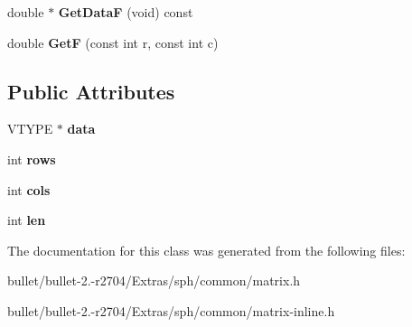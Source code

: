 \begin{DoxyCompactItemize}
\item 
\hypertarget{class_matrix_f_a292d69f3f0849c296cf80ad8487b7ebe}{double $\ast$ {\bfseries Get\+Data\+F} (void) const }\label{class_matrix_f_a292d69f3f0849c296cf80ad8487b7ebe}

\item 
\hypertarget{class_matrix_f_a700f298e441783777fe75bb221e1f88c}{double {\bfseries Get\+F} (const int r, const int c)}\label{class_matrix_f_a700f298e441783777fe75bb221e1f88c}

\end{DoxyCompactItemize}
\subsection*{Public Attributes}
\begin{DoxyCompactItemize}
\item 
\hypertarget{class_matrix_f_a5293f8ebdda28ebcda9fdffc7c7290d0}{V\+T\+Y\+P\+E $\ast$ {\bfseries data}}\label{class_matrix_f_a5293f8ebdda28ebcda9fdffc7c7290d0}

\item 
\hypertarget{class_matrix_f_ab736889294a9cafdc9c7289e2fb052d7}{int {\bfseries rows}}\label{class_matrix_f_ab736889294a9cafdc9c7289e2fb052d7}

\item 
\hypertarget{class_matrix_f_aec195fea449fb0615078fddc7be9c87c}{int {\bfseries cols}}\label{class_matrix_f_aec195fea449fb0615078fddc7be9c87c}

\item 
\hypertarget{class_matrix_f_ad24545bf3a9108f664bf77e30b432728}{int {\bfseries len}}\label{class_matrix_f_ad24545bf3a9108f664bf77e30b432728}

\end{DoxyCompactItemize}


The documentation for this class was generated from the following files\+:\begin{DoxyCompactItemize}
\item 
bullet/bullet-\/2.-\/r2704/\+Extras/sph/common/matrix.\+h\item 
bullet/bullet-\/2.-\/r2704/\+Extras/sph/common/matrix-\/inline.\+h\end{DoxyCompactItemize}
